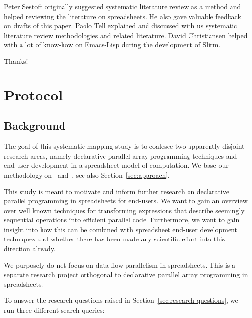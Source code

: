 \documentclass[a4paper]{article}
\begin{document}
Peter Sestoft originally suggested systematic literature review as a method and helped reviewing the literature on spreadsheets. He also gave valuable feedback on drafts of this paper. Paolo Tell explained and discussed with us systematic literature review methodologies and related literature. David Christiansen helped with a lot of know-how on Emacs-Lisp during the development of Slirm.

Thanks!




\appendix

\newpage{}

\section{Protocol}
\label{sec:protocol}

\subsection{Background}
\label{sec:background}

The goal of this systematic mapping study is to coalesce two apparently disjoint research areas, namely declarative parallel array programming techniques and end-user development in a spreadsheet model of computation. We base our methodology on~\citet{keele2007guidelines}
and~\citet{petersen2008systematic}, see also Section~\ref{sec:approach}.

This study is meant to motivate and inform further research on declarative parallel programming in spreadsheets for end-users. We want to gain an overview over well known techniques for transforming expressions that describe seemingly sequential operations into efficient parallel code. Furthermore, we want to gain insight into how this can be combined with spreadsheet end-user development techniques and whether there has been made any scientific effort into this direction already.

We purposely do not focus on data-flow parallelism in spreadsheets. This is a separate research project orthogonal to declarative parallel array programming in spreadsheets.

To answer the research questions raised in Section~\ref{sec:research-questions}, we run three different search queries:
\end{document}
